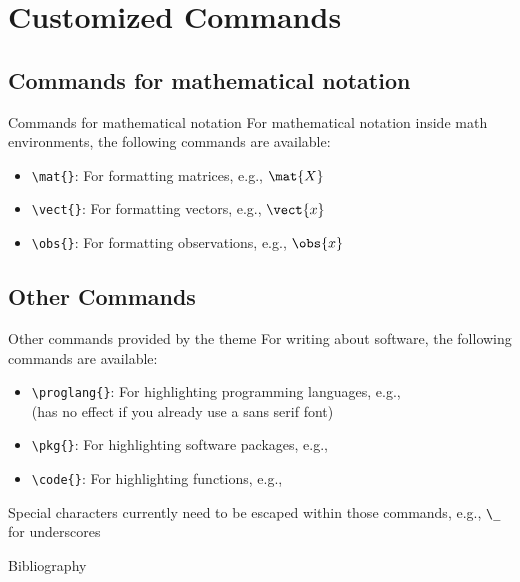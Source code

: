 \documentclass[pdfpagelabels=false, usepdftitle=false]{beamer}
\begin{document}
\section{Customized Commands}
\subsection{Commands for mathematical notation}
\begin{frame}[fragile]{Commands for mathematical notation}
For mathematical notation inside math environments, the following commands are
available:

\bigskip
\begin{itemize}
  \item \verb+\mat{}+: For formatting matrices, e.g., $\mat{X}$
  \medskip
  \item \verb+\vect{}+: For formatting vectors, e.g., $\vect{x}$
  \medskip
  \item \verb+\obs{}+: For formatting observations, e.g., $\obs{x}$
\end{itemize}
\end{frame}



\subsection{Other Commands}
\begin{frame}[fragile]{Other commands provided by the theme}
For writing about software, the following commands are available:
\begin{itemize}
  \item \verb+\proglang{}+: For highlighting programming languages, e.g.,
   \\
  \smallskip
  {\small (has no effect if you already use a sans serif font)}
  \medskip
  \item \verb+\pkg{}+: For highlighting software packages, e.g., 
  \medskip
  \item \verb+\code{}+: For highlighting functions, e.g.,
\end{itemize}

\vfill

\begin{itemize}
  \arrowitem Special characters currently need to be escaped within those
  commands, e.g., \verb+\_+ for underscores
\end{itemize}
\end{frame}



\begin{frame}{Bibliography}
\tiny 


\end{frame}
\end{document}
